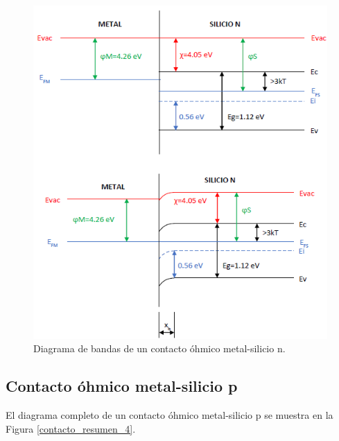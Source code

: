 \begin{figure}[H]
    \centering
    \includegraphics{figuras/contacto_resumen_3.png}
    \caption{Diagrama de bandas de un contacto óhmico metal-silicio n.}
    \label{contacto_resumen_3}
\end{figure}

\newpage
\subsection{Contacto óhmico metal-silicio p}

El diagrama completo de un contacto óhmico metal-silicio p se muestra en la Figura \ref{contacto_resumen_4}.


